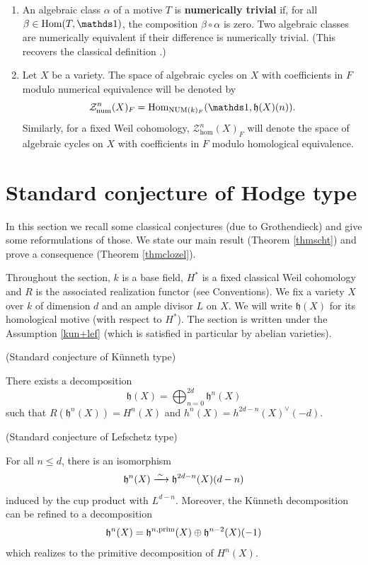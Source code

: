\documentclass[11pt]{amsart}
\begin{document}
\begin{enumerate}
\item An algebraic class $\alpha$ of a motive $T$ is \textbf{numerically trivial} if, for all $\beta\in\Hom(T,\one)$, the composition
$\beta \circ \alpha $  is zero. Two algebraic classes are numerically equivalent if their difference is numerically trivial. (This recovers the classical definition \cite[7.1.2]{AK}.)

\item Let $X$ be a variety. The space of algebraic cycles on $X$ with coefficients in $F$ modulo numerical equivalence will be denoted by \[\mathcal{Z}^{n}_{\num}(X)_{F}= \Hom_{\NUM(k)_F}(\one, \mathfrak{h}(X)(n)).\]
Similarly, for a fixed Weil cohomology, $\mathcal{Z}^{n}_{\hom}(X)_{F}$ will denote the space of algebraic cycles on $X$ with coefficients in $F$ modulo homological equivalence.



\end{enumerate}


\section{Standard conjecture of Hodge type}

In this section we recall some classical conjectures (due to Grothendieck) and give some reformulations of those. We state our main result (Theorem \ref{thmscht}) and prove a consequence (Theorem \ref{thmclozel}).

Throughout the section, $k$ is a base field, $H^*$ is a fixed classical Weil cohomology and $R$ is the associated realization functor (see Conventions). We fix a variety $X$  over $k$ of dimension $d$ and  an ample divisor $L$ on $X$. We will write $\mathfrak{h}(X)$ for its homological motive (with respect to $H^*$). The section is written under the Assumption \ref{kun+lef} (which is satisfied in particular by abelian varieties).

\begin{conj}\label{conjkun} (Standard conjecture of K\"unneth type)


\noindent There exists a decomposition 
\[\mathfrak{h}(X)=\bigoplus_{n=0}^{2d} \mathfrak{h}^n(X)\] 
such that $R(\mathfrak{h}^n(X))=H^n(X)$ and $h^n(X)=h^{2d-n}(X)^{\vee}(-d).$
\end{conj}

\begin{conj}\label{conjlef} (Standard conjecture of Lefschetz type)

\noindent For all $n \leq d$, there is an isomorphism
\[\mathfrak{h}^n(X) \xrightarrow{\hspace{1.85pt}\sim \hspace{1.85pt}} \mathfrak{h}^{2d-n}(X)(d-n)\]
induced by the cup product with $L^{d-n}$. Moreover, the K\"unneth decomposition can be refined to a  decomposition 
\[\mathfrak{h}^n(X)= \mathfrak{h}^{n,\mathrm{prim}}(X)\oplus \mathfrak{h}^{n-2}(X)(-1)\] 
 which realizes to the primitive decomposition of $H^n(X)$.
\end{conj}
\end{document}
